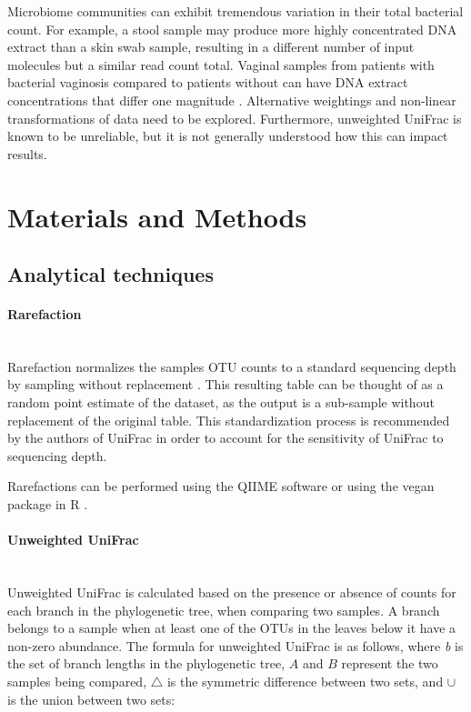 \documentclass[10pt,letterpaper]{article}
\begin{document}
Microbiome communities can exhibit tremendous variation in their total bacterial count. For example, a stool sample may produce more highly concentrated DNA extract than a skin swab sample, resulting in a different number of input molecules but a similar read count total. Vaginal samples from patients with bacterial vaginosis compared to patients without can have DNA extract concentrations that differ one magnitude \cite{zozaya2010quantitative}. Alternative weightings and non-linear transformations of data need to be explored. Furthermore, unweighted UniFrac is known to be unreliable, but it is not generally understood how this can impact results.

\section*{Materials and Methods}

\subsection{Analytical techniques}

\paragraph{Rarefaction}\mbox{}\\
Rarefaction normalizes the samples OTU counts to a standard sequencing depth by sampling without replacement \cite{simberloff1978use}. This resulting table can be thought of as a random point estimate of the dataset, as the output is a sub-sample without replacement of the original table. This standardization process is recommended by the authors of UniFrac \cite{de2011evaluation} in order to account for the sensitivity of UniFrac to sequencing depth.

Rarefactions can be performed using the QIIME software \cite{caporaso2010qiime} or using the vegan package in R \cite{oksanen2007vegan}.

\paragraph{Unweighted UniFrac}\mbox{}\\
Unweighted UniFrac is calculated based on the presence or absence of counts for each branch in the phylogenetic tree, when comparing two samples. A branch belongs to a sample when at least one of the OTUs in the leaves below it have a non-zero abundance. The formula for unweighted UniFrac is as follows, where \textit{b} is the set of branch lengths in the phylogenetic tree, $A$ and $B$ represent the two samples being compared, $\triangle$ is the symmetric difference between two sets, and $\cup$ is the union between two sets:
\end{document}
